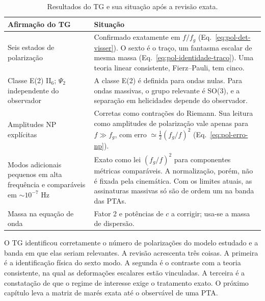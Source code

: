 \begin{table}[htbp]
\centering
\caption{Resultados do TG e sua situação após a revisão exata.}
\label{tab:pol-sintese}
\small
\begin{tabular}{p{}p{}}
\toprule
Afirmação do TG & Situação\\
\midrule
Seis estados de polarização & Confirmado exatamente em $f/f_g$
(Eq.~\ref{eq:pol-det-visser}). O sexto é o traço, um fantasma escalar
de mesma massa (Eq.~\ref{eq:pol-identidade-traco}). Uma teoria linear
consistente, Fierz--Pauli, tem cinco.\\[1mm]
Classe E(2) II$_6$; $\Psi_2$ independente do observador & A classe E(2)
é definida para ondas nulas. Para ondas massivas, o grupo relevante é
SO(3), e a separação em helicidades depende do observador.\\[1mm]
Amplitudes NP explícitas & Corretas como contrações do Riemann. Sua
leitura como amplitudes de polarização vale apenas para
$f\gg f_g$, com erro $\simeq\frac12(f_g/f)^2$
(Eq.~\ref{eq:pol-erro-np}).\\[1mm]
Modos adicionais pequenos em alta frequência e comparáveis em
$\sim10^{-7}$ Hz & Exato como lei $(f_g/f)^2$ para componentes
métricas comparáveis. A normalização, porém, não é fixada pela
cinemática. Com os limites atuais, as assinaturas massivas só são de
ordem um na banda das PTAs.\\[1mm]
Massa na equação de onda & Fator 2 e potências de $c$ a corrigir;
usa-se a massa de dispersão.\\
\bottomrule
\end{tabular}
\end{table}

O TG identificou corretamente o número de polarizações do modelo
estudado e a banda em que elas seriam relevantes. A revisão acrescenta
três coisas. A primeira é a identificação física do sexto modo. A
segunda é o contraste com a teoria consistente, na qual as deformações
escalares estão vinculadas. A terceira é a constatação de que o regime
de interesse exige o tratamento exato. O próximo capítulo leva a matriz
de marés exata até o observável de uma PTA.
